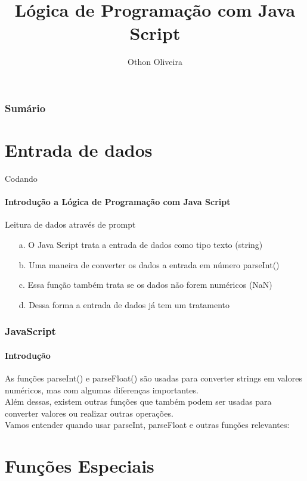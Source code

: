 \documentclass[13pt, xcolor={dvipsnames,svgnames}, portuguese]{beamer}
\author{Othon Oliveira}
\title{Lógica de Programação com Java Script}
\institute{SENAC - PROA}
\date{}
\begin{document}
\begin{frame}
\titlepage
\end{frame}

\newcommand{\capa}{
    \begin{tikzpicture}[remember picture,overlay]
        \node at (current page.south west)
            {\begin{tikzpicture}[remember picture, overlay]
                \fill[shading=radial,top color=orange,bottom color=orange,middle color=yellow] (0,0) rectangle (\paperwidth,\paperheight);
            \end{tikzpicture}
          };
    \end{tikzpicture}
}

\begin{frame}\frametitle{Sumário}
\tableofcontents
\end{frame}


\section{Entrada de dados}
\begin{frame}{Codando}
\framesubtitle{Introdução a Lógica de Programação com Java Script}
	\begin{block}{Leitura de dados através de prompt}
		\begin{itemize}
		  \item[a.] O Java Script trata a entrada de dados como tipo texto (string)
		  \pause
		  \item[b.] Uma maneira de converter os dados a entrada em número parseInt()
		   \pause		  
		  \item[c.] Essa função também trata se os dados não forem numéricos (NaN)
		  \pause
		  \item[d.] Dessa forma a entrada de dados já tem um tratamento 
		\end{itemize}
	\end{block} 
\end{frame}


\begin{frame}
\frametitle{JavaScript}
\framesubtitle{Introdução}

As funções parseInt() e parseFloat() são usadas para converter strings em valores numéricos, mas com algumas diferenças importantes.\\
 Além dessas, existem outras funções que também podem ser usadas para converter valores ou realizar outras operações.\\ 
 Vamos entender quando usar parseInt, parseFloat e outras funções relevantes:

\section{Funções Especiais}

\end{frame}
\end{document}
